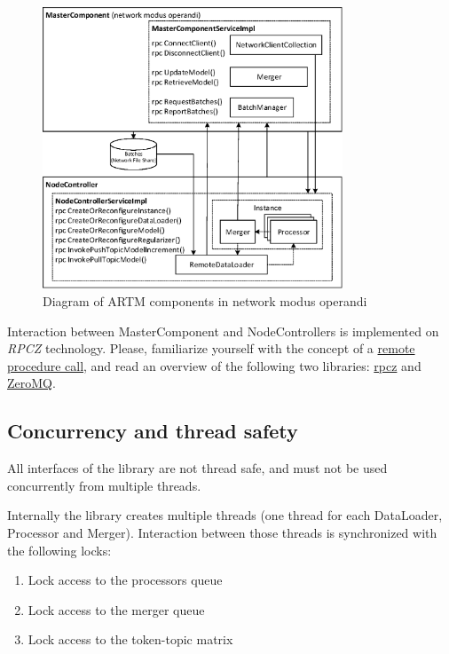 \documentclass[11pt,a4paper,twoside]{report}
\begin{document}
\begin{figure}[h!]
\begin{centering}
\includegraphics[height=84mm]{diagramm_artm_network.eps}
\caption{Diagram of ARTM components in network modus operandi}
\label{fig:diagramm_artm_network}
\end{centering}
\end{figure}
\vspace{1ex}

Interaction between MasterComponent and NodeControllers is implemented on \emph{RPCZ} technology.
Please, familiarize yourself with the concept of a
\href{en.wikipedia.org/wiki/Remote_procedure_call}{remote procedure call},
and read an overview of the following two libraries:
\href{code.google.com/p/rpcz/}{rpcz} and \href{http://zeromq.org}{ZeroMQ}.

\subsection{Concurrency and thread safety}
All interfaces of the library are not thread safe,
and must not be used concurrently from multiple threads.

Internally the library creates multiple threads
(one thread for each DataLoader, Processor and Merger).
Interaction between those threads is synchronized with the following locks:
\begin{enumerate}
    \item Lock access to the processors queue
    \item Lock access to the merger queue
    \item Lock access to the token-topic matrix
\end{enumerate}
\end{document}
